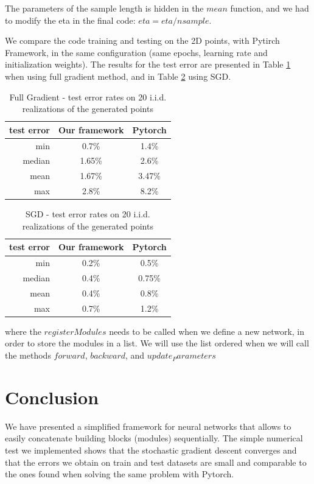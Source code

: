 \documentclass[10pt,final,a4paper]{article}
\begin{document}
The parameters of the sample length is hidden in the $mean$ function, and we had to modify the eta in the final code: $eta=eta/nsample$.

We compare the code training and testing on the 2D points, with Pytirch Framework, in the same configuration (same epochs, learning rate and initialization weights). The results for the test error are presented in Table \ref{t1} when using full gradient method, and in Table \ref{t2} using SGD.
\begin{table}
\begin{center}
\begin{tabular}{ r | c| c  }
test error & Our framework & Pytorch \\
\hline
min & 0.7\%  & 1.4\% \\
median & 1.65\% & 2.6\% \\
mean & 1.67\%& 3.47\% \\
max & 2.8\% & 8.2\% 
\end{tabular}
\end{center} 
\caption{Full Gradient - test error rates on 20 i.i.d. realizations of the generated points}\label{t1}
\end{table}

\begin{table}
\begin{center}
\begin{tabular}{ r | c| c  }
test error & Our framework & Pytorch \\
\hline
min & 0.2\%  & 0.5\% \\
median & 0.4\% & 0.75\% \\
mean & 0.4\%& 0.8\% \\
max & 0.7\% & 1.2\% 
\end{tabular}
\end{center} 

\caption{SGD - test error rates on 20 i.i.d. realizations of the generated points}\label{t2}
\end{table}

where the $registerModules$ needs to be called when we define a new network, in order to store the modules in a list. We will use the list ordered when we will call the methods $forward$, $backward$, and $update_Parameters$

\section{Conclusion}
We have presented a simplified framework for neural networks that allows to easily concatenate building blocks (modules) sequentially. The simple numerical test we implemented shows that the stochastic gradient descent converges and that the errors we obtain on train and test datasets are small and comparable to the ones found when solving the same problem with Pytorch. 
\end{document}
